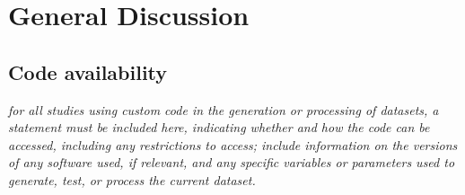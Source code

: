 \documentclass[english]{article}
\begin{document}
\section*{General Discussion}


\subsection*{Code availability}
\emph{for all studies using custom code in the generation or processing of datasets,
a statement must be included here, indicating whether and how the code can be
accessed, including any restrictions to access; include information on the versions
of any software used, if relevant, and any specific variables or parameters used to
generate, test, or process the current dataset. }
\end{document}

